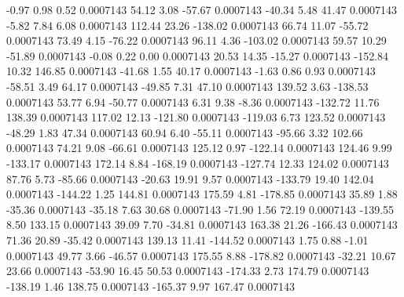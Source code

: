        -0.97        0.98        0.52     0.0007143
       54.12        3.08      -57.67     0.0007143
      -40.34        5.48       41.47     0.0007143
       -5.82        7.84        6.08     0.0007143
      112.44       23.26     -138.02     0.0007143
       66.74       11.07      -55.72     0.0007143
       73.49        4.15      -76.22     0.0007143
       96.11        4.36     -103.02     0.0007143
       59.57       10.29      -51.89     0.0007143
       -0.08        0.22        0.00     0.0007143
       20.53       14.35      -15.27     0.0007143
     -152.84       10.32      146.85     0.0007143
      -41.68        1.55       40.17     0.0007143
       -1.63        0.86        0.93     0.0007143
      -58.51        3.49       64.17     0.0007143
      -49.85        7.31       47.10     0.0007143
      139.52        3.63     -138.53     0.0007143
       53.77        6.94      -50.77     0.0007143
        6.31        9.38       -8.36     0.0007143
     -132.72       11.76      138.39     0.0007143
      117.02       12.13     -121.80     0.0007143
     -119.03        6.73      123.52     0.0007143
      -48.29        1.83       47.34     0.0007143
       60.94        6.40      -55.11     0.0007143
      -95.66        3.32      102.66     0.0007143
       74.21        9.08      -66.61     0.0007143
      125.12        0.97     -122.14     0.0007143
      124.46        9.99     -133.17     0.0007143
      172.14        8.84     -168.19     0.0007143
     -127.74       12.33      124.02     0.0007143
       87.76        5.73      -85.66     0.0007143
      -20.63       19.91        9.57     0.0007143
     -133.79       19.40      142.04     0.0007143
     -144.22        1.25      144.81     0.0007143
      175.59        4.81     -178.85     0.0007143
       35.89        1.88      -35.36     0.0007143
      -35.18        7.63       30.68     0.0007143
      -71.90        1.56       72.19     0.0007143
     -139.55        8.50      133.15     0.0007143
       39.09        7.70      -34.81     0.0007143
      163.38       21.26     -166.43     0.0007143
       71.36       20.89      -35.42     0.0007143
      139.13       11.41     -144.52     0.0007143
        1.75        0.88       -1.01     0.0007143
       49.77        3.66      -46.57     0.0007143
      175.55        8.88     -178.82     0.0007143
      -32.21       10.67       23.66     0.0007143
      -53.90       16.45       50.53     0.0007143
     -174.33        2.73      174.79     0.0007143
     -138.19        1.46      138.75     0.0007143
     -165.37        9.97      167.47     0.0007143
